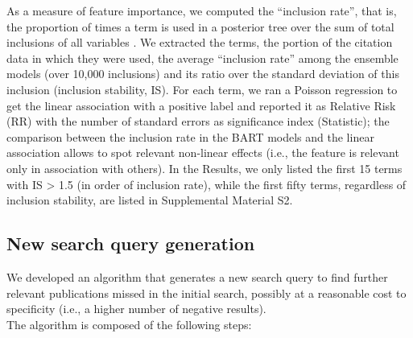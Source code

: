 \documentclass[]{bmcart}
\begin{document}
As a measure of feature importance, we computed the ``inclusion rate'',
that is, the proportion of times a term is used in a posterior tree over
the sum of total inclusions of all variables
\citep{kapelner2013bartmachine}. We extracted the terms, the portion of
the citation data in which they were used, the average ``inclusion
rate'' among the ensemble models (over 10,000 inclusions) and its ratio
over the standard deviation of this inclusion (inclusion stability, IS).
For each term, we ran a Poisson regression to get the linear association
with a positive label and reported it as Relative Risk (RR) with the
number of standard errors as significance index (Statistic); the
comparison between the inclusion rate in the BART models and the linear
association allows to spot relevant non-linear effects (i.e., the
feature is relevant only in association with others). In the Results, we
only listed the first 15 terms with IS \textgreater{} 1.5 (in order of
inclusion rate), while the first fifty terms, regardless of inclusion
stability, are listed in Supplemental Material S2.

\subsection*{New search query generation}

We developed an algorithm that generates a new search query to find
further relevant publications missed in the initial search, possibly at
a reasonable cost to specificity (i.e., a higher number of negative
results).\\
The algorithm is composed of the following steps:
\end{document}
